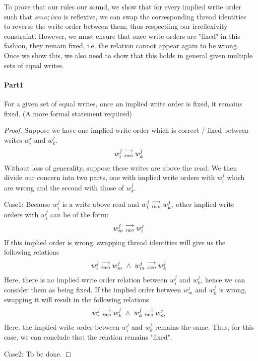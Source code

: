         To prove that our rules our sound, we show that for every implied write order such that $smo;iwo$ is reflexive, we can swap the corresponding thread identities to reverse the write order between them, thus respectiing our irreflexivity constraint. However, we must ensure that once write orders are "fixed" in this fashion, they remain fixed, i.e. the relation cannot appear again to be wrong. Once we show this, we also need to show that this holds in general given multiple sets of equal writes. 
        
        \paragraph{Part1}
            For a given set of equal writes, once an implied write order is fixed, it remains fixed. 
            (A more formal statement required)
        \begin{proof}
            Suppose we have one implied write order which is correct / fixed between writes $w_i^j$ and $w_k^j$.
            \begin{align}
                w_i^j\stackrel{\longrightarrow}{_{iwo}}w_k^j
            \end{align}
            Without loss of generality, suppose these writes are above the read. We then divide our concern into two parts, one with implied write orders with $w_i^j$ which are wrong and the second with those of $w_k^j$.

            Case1: 
            Because $w_i^j$ is a write above read and $w_i^j\stackrel{\longrightarrow}{_{iwo}}w_k^j$, other implied write orders with $w_i^j$ can be of the form:
            \begin{align}
                w_m^j\stackrel{\longrightarrow}{_{iwo}}w_i^j
            \end{align}
            If this implied order is wrong, swapping thread identities will  give us the following relations 
            \begin{align}
                \reln{w_i^j}{iwo}{w_m^j} \ \wedge \ \reln{w_m^j}{iwo}{w_k^j}  
            \end{align}  
            Here, there is no implied write order relation between $w_i^j$ and $w_k^j$, hence we can consider them as being fixed. 
            If the implied order between $w_m^j$ and $w_k^j$ is wrong, swapping it will result in the following relations
            \begin{align}
                \reln{w_i^j}{iwo}{w_k^j} \ \wedge \ \reln{w_k^j}{iwo}{w_m^j}  
            \end{align}  
            Here, the implied write order between $w_i^j$ and $w_k^j$ remains the same. Thus, for this case, we can conclude that the relation remains "fixed".

            Case2: 
            To be done.
        \end{proof}


